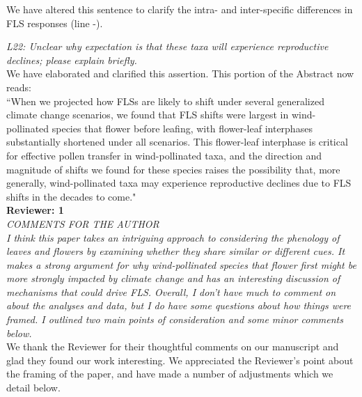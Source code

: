 \documentclass[11pt]{article}
\begin{document}
\noindent We have altered this sentence to clarify the intra- and inter-specific differences in FLS responses (line -).

\emph{L22: Unclear why expectation is that these taxa will experience reproductive declines; please explain briefly.}\\
 
\noindent We have elaborated and clarified this assertion. This portion of the Abstract now reads:\\
 
 ``When we projected how FLSs are likely to shift under several generalized climate change scenarios, we found that FLS shifts were largest in wind-pollinated species that flower before leafing, with flower-leaf interphases substantially shortened under all scenarios. This flower-leaf interphase is critical for effective pollen transfer in wind-pollinated taxa, and the direction and magnitude of shifts we found for these species raises the possibility that, more generally, wind-pollinated taxa may experience reproductive declines due to FLS shifts in the decades to come."\\

\textbf{Reviewer: 1}\\

\emph{COMMENTS FOR THE AUTHOR\\
I think this paper takes an intriguing approach to considering the phenology of leaves and flowers by examining whether they share similar or different cues. It makes a strong argument for why wind-pollinated species that flower first might be more strongly impacted by climate change and has an interesting discussion of mechanisms that could drive FLS. Overall, I don’t have much to comment on about the analyses and data, but I do have some questions about how things were framed. I outlined two main points of consideration and some minor comments below.}\\

\noindent We thank the Reviewer for their thoughtful comments on our manuscript and glad they found our work interesting. We appreciated the Reviewer's point about the framing of the paper, and have made a number of adjustments which we detail below. \\
\end{document}
